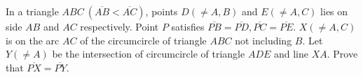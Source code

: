 In a triangle $ABC ~(\overline{AB} < \overline{AC})$, points $D (\neq A, B)$ and $E (\neq A, C)$ lies on side $AB$ and $AC$ respectively. Point $P$ satisfies $\overline{PB}=\overline{PD}, \overline{PC}=\overline{PE}$. $X (\neq A, C)$ is on the arc $AC$ of the circumcircle of triangle $ABC$ not including $B$. Let $Y (\neq A)$ be the intersection of circumcircle of triangle $ADE$ and line $XA$. Prove that $\overline{PX} = \overline{PY}$.